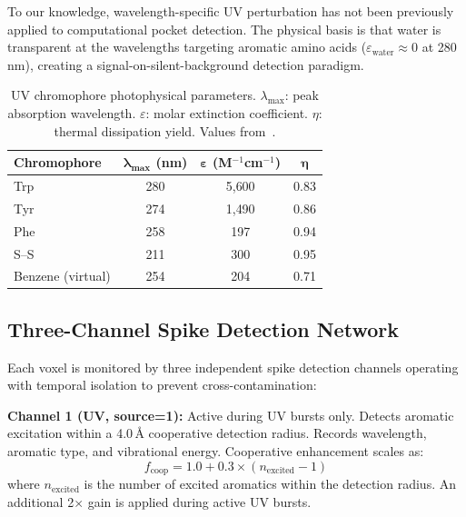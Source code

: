 \documentclass{sn-jnl}
\begin{document}
To our knowledge, wavelength-specific UV perturbation has not been previously applied to
computational pocket detection. The physical basis is that water is transparent at the
wavelengths targeting aromatic amino acids ($\varepsilon_{\text{water}} \approx 0$ at
280\,nm), creating a signal-on-silent-background detection paradigm.

\begin{table}[h]
\centering
\caption{UV chromophore photophysical parameters. $\lambda_{\max}$: peak absorption
wavelength. $\varepsilon$: molar extinction coefficient. $\eta$: thermal dissipation yield.
Values from~\cite{wetlaufer1962,pace1995,pantos1978,cundall1972}.}
\label{tab:chromophores}
\begin{tabular}{lccc}
\toprule
\textbf{Chromophore} & $\boldsymbol{\lambda_{\max}}$ \textbf{(nm)} &
$\boldsymbol{\varepsilon}$ \textbf{(M$^{-1}$cm$^{-1}$)} & $\boldsymbol{\eta}$ \\
\midrule
Trp   & 280 & 5{,}600 & 0.83 \\
Tyr   & 274 & 1{,}490 & 0.86 \\
Phe   & 258 & 197     & 0.94 \\
S--S  & 211 & 300     & 0.95 \\
Benzene (virtual) & 254 & 204 & 0.71 \\
\bottomrule
\end{tabular}
\end{table}

\subsection{Three-Channel Spike Detection Network}
\label{sec:channels}

Each voxel is monitored by three independent spike detection channels operating with temporal
isolation to prevent cross-contamination:

\smallskip\noindent\textbf{Channel 1 (UV, source=1):} Active during UV bursts only. Detects
aromatic excitation within a 4.0\,\AA{} cooperative detection radius. Records wavelength,
aromatic type, and vibrational energy. Cooperative enhancement scales as:
\begin{equation}
  f_{\text{coop}} = 1.0 + 0.3 \times (n_{\text{excited}} - 1)
  \label{eq:cooperative}
\end{equation}
where $n_{\text{excited}}$ is the number of excited aromatics within the detection radius.
An additional 2$\times$ gain is applied during active UV bursts.
\end{document}
